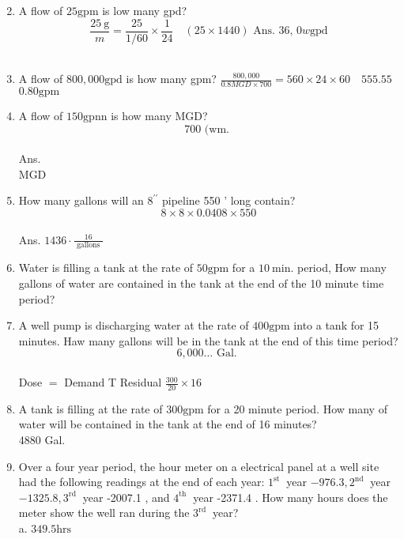 \begin{enumerate}
$$$$
\item A flow of $25 \mathrm{gpm}$ is low many gpd?\\
$$
\frac{25 \mathrm{~g}}{m}=\frac{25}{1 / 60} \times \frac{1}{24} \quad(25 \times 1440) \text { Ans. 36, } 0 w \mathrm{gpd}
$$\\
\item A flow of $800,000 \mathrm{gpd}$ is how many gpm? $\frac{800,000}{0.8 M G D \times 700}=560 \times 24 \times 60 \quad 555.55$ $0.80 \mathrm{gpm}$\\
\item A flow of $150 \mathrm{gpnn}$ is how many MGD?\\
$$
700 \text { (wm. }
$$\\
Ans.\\
MGD\\
\item How many gallons will an $8^{\prime \prime}$ pipeline 550 ' long contain?\\
$$
8 \times 8 \times 0.0408 \times 550
$$\\
Ans. $1436 \cdot \frac{16}{\text { gallons }}$\\
\item Water is filling a tank at the rate of $50 \mathrm{gpm}$ for a $10 \mathrm{~min}$. period, How many gallons of water are contained in the tank at the end of the 10 minute time period?\\
\item A well pump is discharging water at the rate of $400 \mathrm{gpm}$ into a tank for 15 minutes. Haw many gallons will be in the tank at the end of this time period?\\
$$
6,000 \ldots \text { Gal. }
$$\\
Dose $=$ Demand T Residual $\frac{300}{20} \times 16$\\
\item A tank is filling at the rate of $300 \mathrm{gpm}$ for a 20 minute period. How many of water will be contained in the tank at the end of 16 minutes?\\
4880 Gal.\\
\item Over a four year period, the hour meter on a electrical panel at a well site had the following readings at the end of each year: $1^{\text {st }}$ year $-976.3,2^{\text {nd }}$ year $-1325.8,3^{\text {rd }}$ year -2007.1 , and $4^{\text {th }}$ year -2371.4 . How many hours does the meter show the well ran during the $3^{\text {rd }}$ year?\\
a. $349.5 \mathrm{hrs}$\\

\end{enumerate}
